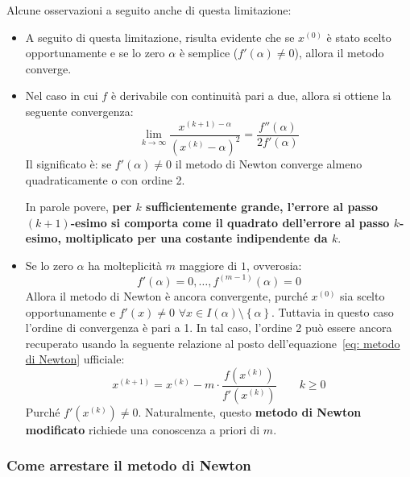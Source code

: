\highspace
Alcune osservazioni a seguito anche di questa limitazione:
\begin{itemize}
    \item A seguito di questa limitazione, risulta evidente che se $x^{(0)}$ è stato scelto opportunamente e se lo zero $\alpha$ è semplice ($f'\left(\alpha\right) \ne 0$), allora il metodo converge.
    
    \item Nel caso in cui $f$ è derivabile con continuità pari a due, allora si ottiene la seguente convergenza:
    \begin{equation}
        \displaystyle \lim_{k \rightarrow \infty} \dfrac{x^{\left(k+1\right) - \alpha}}{\left(x^{(k)} - \alpha\right)^{2}} = \dfrac{f''\left(\alpha\right)}{2f'\left(\alpha\right)}
    \end{equation}
    Il significato è: se $f'\left(\alpha\right) \ne 0$ il metodo di Newton converge almeno quadraticamente o con ordine 2.

    In parole povere, \textbf{per $k$ sufficientemente grande, l'errore al passo $\left(k+1\right)$-esimo si comporta come il quadrato dell'errore al passo $k$-esimo, moltiplicato per una costante indipendente da $k$}.

    \item Se lo zero $\alpha$ ha molteplicità $m$ maggiore di $1$, ovverosia:
    \begin{equation*}
        f'\left(\alpha\right) = 0, \dots, f^{\left(m-1\right)}\left(\alpha\right) = 0
    \end{equation*}
    Allora il metodo di Newton è ancora convergente, purché $x^{(0)}$ sia scelto opportunamente e $f'\left(x\right) \ne 0$ $\forall x \in I\left(\alpha\right) \setminus \left\{\alpha\right\}$. Tuttavia in questo caso l'ordine di convergenza è pari a 1. In tal caso, l'ordine 2 può essere ancora recuperato usando la seguente relazione al posto dell'equazione~\ref{eq: metodo di Newton} ufficiale:
    \begin{equation}
        x^{\left(k+1\right)} = x^{(k)} - m \cdot \dfrac{f\left(x^{(k)}\right)}{f'\left(x^{(k)}\right)} \hspace{2em} k \ge 0
    \end{equation}
    Purché $f'\left(x^{(k)}\right) \ne 0$. Naturalmente, questo \textbf{metodo di Newton modificato} richiede una conoscenza a priori di $m$.
\end{itemize}

\longline

\subsubsection{Come arrestare il metodo di Newton}

